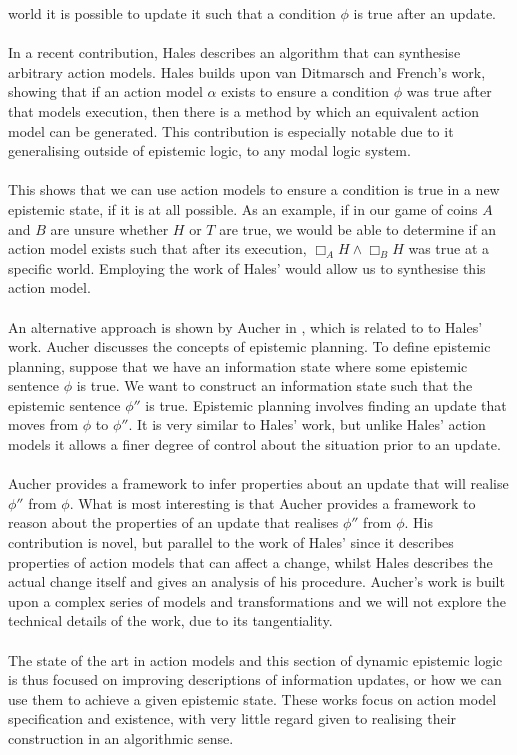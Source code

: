world it is possible to update it such that a condition $\phi$ is true after an
update.\\
\\
In a recent contribution, Hales \cite{hales13synthesis} describes an algorithm that can synthesise arbitrary
action models.
Hales builds upon van Ditmarsch and French's work, showing that if an action
model $\alpha$ exists to ensure a condition $\phi$ was true after that models
execution, then there is a method by which an equivalent action model can be generated.
This contribution is especially notable due to it generalising outside of
epistemic logic, to any modal logic system.\\
\\
This shows that we can use action models to ensure a condition is true
in a new epistemic state, if it is at all possible.
As an example, if in our game of coins $A$ and $B$ are unsure whether $H$ or $T$
are true, we would be able to determine if an action model exists such that
after its execution, $\Box_A H \land \Box_B H$ was true at a
specific world.
Employing the work of Hales' would allow us to synthesise this action model.\\
\\
An alternative approach is shown by Aucher in
\cite{doi:10.3166/jancl.21.289-321,doi:10.1080/11663081.2012.736703}, which is related to
to Hales' work.
Aucher discusses the concepts of epistemic planning.
To define epistemic planning, suppose that we have an information state where
some epistemic sentence $\phi$ is true.
We want to construct an information state such that the epistemic sentence
$\phi''$ is true.
Epistemic planning involves finding an update that moves from $\phi$ to
$\phi''$.
It is very similar to Hales' work, but unlike Hales' action models it allows a
finer degree of control about the situation prior to an update.\\
\\
Aucher provides a framework to infer properties about an update that will
realise $\phi''$ from $\phi$.
What is most interesting is that Aucher provides a framework to reason about the
properties of an update that realises $\phi''$ from $\phi$.
His contribution is novel, but parallel to the work of Hales' since it describes
properties of action models that can affect a change, whilst Hales describes the actual change itself and gives
an analysis of his procedure.
Aucher's work is built upon a complex series of models and transformations and we will not explore
the technical details of the work, due to its tangentiality.\\
\\
The state of the art in action models and this section of dynamic epistemic
logic is thus focused on improving descriptions of information updates, or how
we can use them to achieve a given epistemic state.
These works focus on action model specification and existence, with very little regard given to
realising their construction in an algorithmic sense.

